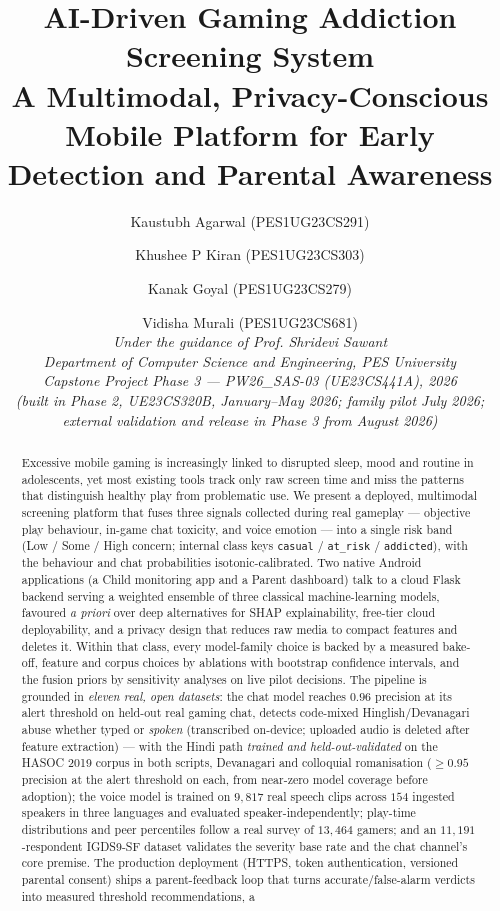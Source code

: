 \documentclass[11pt,a4paper]{article}
\title{\textbf{AI-Driven Gaming Addiction Screening System}\\
\large A Multimodal, Privacy-Conscious Mobile Platform for Early
Detection and Parental Awareness}
\author{
Kaustubh Agarwal (PES1UG23CS291) \and
Khushee P Kiran (PES1UG23CS303) \and
Kanak Goyal (PES1UG23CS279) \and
Vidisha Murali (PES1UG23CS681) \\[0.5em]
\textit{Under the guidance of Prof. Shridevi Sawant} \\
\textit{Department of Computer Science and Engineering, PES University} \\
\textit{Capstone Project Phase 3 --- PW26\_SAS-03 (UE23CS441A), 2026} \\
\textit{(built in Phase 2, UE23CS320B, January--May 2026; family pilot July 2026;}\\
\textit{external validation and release in Phase 3 from August 2026)}
}
\date{}
\begin{document}
\maketitle

\begin{abstract}
\noindent
Excessive mobile gaming is increasingly linked to disrupted sleep, mood and
routine in adolescents, yet most existing tools track only raw screen time and
miss the patterns that distinguish healthy play from problematic use. We present
a deployed, multimodal screening platform that fuses three signals collected
during real gameplay --- objective play behaviour, in-game chat toxicity, and
voice emotion --- into a single risk band (Low / Some / High concern; internal
class keys \texttt{casual} / \texttt{at\_risk} / \texttt{addicted}), with the behaviour and chat
probabilities isotonic-calibrated. Two native Android applications (a Child
monitoring app and a Parent dashboard) talk to a cloud Flask backend serving a
weighted ensemble of three classical machine-learning models, favoured \emph{a
priori} over deep alternatives for SHAP explainability, free-tier cloud
deployability, and a privacy design that reduces raw media to compact features
and deletes it. Within that class, every model-family choice is backed by a measured bake-off,
feature and corpus choices by ablations with bootstrap confidence intervals, and
the fusion priors by sensitivity analyses on live pilot decisions. The pipeline
is grounded in \emph{eleven real, open datasets}: the chat model reaches $0.96$
precision at its alert threshold on held-out real gaming chat, detects
code-mixed Hinglish/Devanagari abuse whether typed or \emph{spoken} (transcribed
on-device; uploaded audio is deleted after feature extraction) --- with the
Hindi path \emph{trained and held-out-validated} on the HASOC 2019 corpus in
both scripts, Devanagari and colloquial romanisation ($\geq$$0.95$ precision at
the alert threshold on each, from near-zero model coverage before adoption); the voice model
is trained on $9{,}817$ real speech clips across $154$ ingested speakers in
three languages and evaluated speaker-independently; play-time distributions and
peer percentiles follow a real survey of $13{,}464$ gamers; and an
$11{,}191$-respondent IGDS9-SF dataset validates the severity base rate and the
chat channel's core premise. The production deployment (HTTPS, token
authentication, versioned parental consent) ships a parent-feedback loop that
turns accurate/false-alarm verdicts into measured threshold recommendations, a
$$
\end{abstract}
\end{document}

